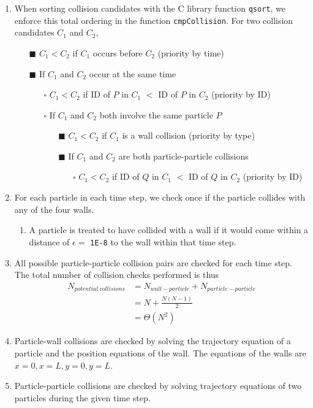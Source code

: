 \documentclass[12pt]{article}
\begin{document}
\begin{enumerate}
\begin{enumerate}
	\end{enumerate}
	\item When sorting collision candidates with the C library function \texttt{qsort}, we enforce this total ordering in the function \texttt{cmpCollision}. For two collision candidates  $C_1$ and $C_2$,
	\begin{itemize}
		\item[$\blacksquare$] $C_1 < C_2$ if $C_1$ occurs before $C_2$ (priority by time)
		\item[$\blacksquare$] If $C_1$ and $C_2$ occur at the same time
		\begin{itemize}
			\item[$\square$] $C_1 < C_2$ if ID of $P$ in $C_1$ $<$ ID of $P$ in $C_2$ (priority by ID)
			\item[$\square$] If $C_1$ and $C_2$ both involve the same particle $P$
				\begin{itemize}
					\item[$\blacksquare$] $C_1 < C_2$ if $C_1$ is a wall collision (priority by type)
					\item[$\blacksquare$] If $C_1$ and $C_2$ are both particle-particle collisions
						\begin{itemize}
							\item[$\square$] $C_1 < C_2$ if ID of $Q$ in $C_1$ $<$ ID of $Q$ in $C_2$ (priority by ID)
						\end{itemize}
				\end{itemize}
		\end{itemize}
	\end{itemize}
	\item For each particle in each time step, we check once if the particle collides with any of the four walls.
	    \begin{enumerate}
	        \item A particle is treated to have collided with a wall if it would come within a distance of $\epsilon = $ \texttt{1E-8} to the wall within that time step.
	    \end{enumerate}
	\item All possible particle-particle collision pairs are checked for each time step. The total number of collision checks performed is thus
	\begin{align*}
	N_{potential\ collisions} 	&= N_{wall-particle} + N_{particle-particle} \\
						&= N + \frac{N(N-1)}{2} \\
						&= \Theta (N^2)
	\end{align*}
	\item Particle-wall collisions are checked by solving the trajectory equation of a particle and the position equations of the wall. The equations of the walls are $x = 0, x = L, y = 0, y = L$.
	\item \label{trajectory-calc} Particle-particle collisions are checked by solving trajectory equations of two particles during the given time step.\\
	

\end{enumerate}
\end{document}
